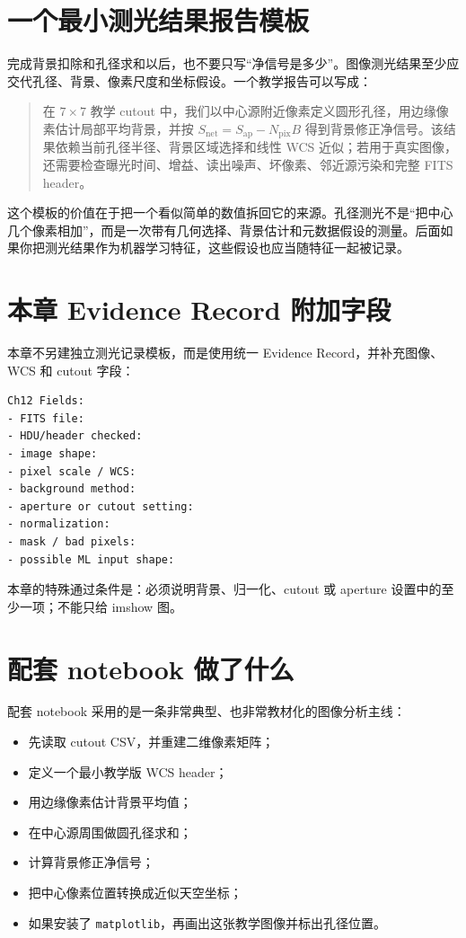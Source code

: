 \section{一个最小测光结果报告模板}

完成背景扣除和孔径求和以后，也不要只写“净信号是多少”。图像测光结果至少应交代孔径、背景、像素尺度和坐标假设。一个教学报告可以写成：

\begin{quote}
在 \(7\times7\) 教学 cutout 中，我们以中心源附近像素定义圆形孔径，用边缘像素估计局部平均背景，并按 \(S_{\mathrm{net}}=S_{\mathrm{ap}}-N_{\mathrm{pix}}B\) 得到背景修正净信号。该结果依赖当前孔径半径、背景区域选择和线性 WCS 近似；若用于真实图像，还需要检查曝光时间、增益、读出噪声、坏像素、邻近源污染和完整 FITS header。
\end{quote}

这个模板的价值在于把一个看似简单的数值拆回它的来源。孔径测光不是“把中心几个像素相加”，而是一次带有几何选择、背景估计和元数据假设的测量。后面如果你把测光结果作为机器学习特征，这些假设也应当随特征一起被记录。

\section{本章 Evidence Record 附加字段}

本章不另建独立测光记录模板，而是使用统一 Evidence Record，并补充图像、WCS 和 cutout 字段：

\begin{examplebox}
\begin{lstlisting}[style=terminal]
Ch12 Fields:
- FITS file:
- HDU/header checked:
- image shape:
- pixel scale / WCS:
- background method:
- aperture or cutout setting:
- normalization:
- mask / bad pixels:
- possible ML input shape:
\end{lstlisting}
\end{examplebox}

本章的特殊通过条件是：必须说明背景、归一化、cutout 或 aperture 设置中的至少一项；不能只给 imshow 图。

\section{配套 notebook 做了什么}

配套 notebook 采用的是一条非常典型、也非常教材化的图像分析主线：

\begin{itemize}
    \item 先读取 cutout CSV，并重建二维像素矩阵；
    \item 定义一个最小教学版 WCS header；
    \item 用边缘像素估计背景平均值；
    \item 在中心源周围做圆孔径求和；
    \item 计算背景修正净信号；
    \item 把中心像素位置转换成近似天空坐标；
    \item 如果安装了 \texttt{matplotlib}，再画出这张教学图像并标出孔径位置。
\end{itemize}

